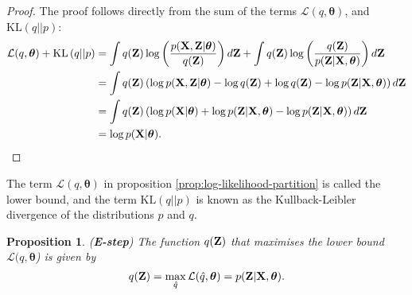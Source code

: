 \documentclass[11pt]{article}
\numberwithin{equation}{section}
\newcommand{\KL}[2]{\text{KL}\left(#1 \vert\vert #2\right)}
\newcommand{\Z}{{\bf Z}}
\newtheorem{proposition}{Proposition}[section]
\begin{document}
\begin{proof}
	The proof follows directly from the sum of the terms $\mathcal{L}(q, \boldsymbol{\theta})$, and  $\text{KL}(q \vert\vert p)$:
	\begin{align}
		\mathcal{L}(q, \boldsymbol{\theta}) + \KL{q}{p} &= \int q({\bf Z})\log\left(\frac{p({\bf X}, {\bf Z} \vert \boldsymbol\theta)}{q({\bf Z})}\right) d{\bf Z} + \int q({\bf Z}) \log\left(\frac{q({\bf Z})}{p({\bf Z}\vert {\bf X}, \boldsymbol\theta)}\right) d{\bf Z}\\
		&= \int q({\bf Z})\left(\log p({\bf X, {\bf Z} \vert \boldsymbol{\theta}}) - \log q({\bf Z}) + \log q({\bf Z}) - \log p({\bf Z} \vert {\bf X}, \boldsymbol\theta)\right) d{\bf Z}\\
		&= \int q({\bf Z})\left(\log p({\bf X} \vert \boldsymbol{\theta}) + \log p({\bf Z} \vert {\bf X}, \boldsymbol{\theta}) - \log p({\bf Z} \vert {\bf X}, \boldsymbol\theta)\right) d{\bf Z}\\
		&= \log p({\bf X}\vert \boldsymbol\theta).
	\end{align}
\end{proof}

The term $\mathcal{L}(q, \boldsymbol\theta)$ in proposition \ref{prop:log-likelihood-partition} is called the lower bound, and the term $\KL{q}{p}$ is known as the Kullback-Leibler divergence of the distributions $p$ and $q$. 


\begin{proposition} (\textbf{E-step})
	The function $q({\bf Z})$ that maximises the lower bound $\mathcal L(q, \boldsymbol{\theta}$) is given by
	\begin{equation}
		q(\Z) = \max_{\hat q} \mathcal{L}(\hat q, \boldsymbol\theta) = p({\bf Z} \vert {\bf X}, \boldsymbol\theta).
	\end{equation}
\end{proposition}
\end{document}
